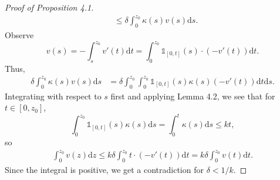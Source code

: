 \documentclass{article}
\begin{document}
\begin{proof}[Proof of Proposition 4.1]
\begin{align*}
        &\leq \delta\int_0^{z_0}\kappa(s)v(s)\mathrm{d}s.
    \end{align*}
    Observe
    \[v(s) = -\int_s^{z_0}v'(t)\mathrm{d}t  = \int_0^{z_0}\mathds 1_{[0,t]}(s)\cdot(-v'(t))\mathrm{d}t .\]
    Thus,
    \begin{align*}
        \delta\int_0^{z_0}\kappa(s)v(s)\mathrm{d}s &= \delta\int_0^{z_0}\int_0^{z_0}\mathds 1_{[0,t]}(s)\kappa(s)(-v'(t))\mathrm{d}t \mathrm{d}s.
    \end{align*}
    Integrating with respect to $s$ first and applying Lemma 4.2, we see that for $t\in[0,z_0]$,
    \[\int_0^{z_0}\mathds 1_{[0,t]}(s)\kappa(s)\mathrm{d}s =  \int_0^t \kappa(s)\mathrm{d}s \leq kt,\]
    so
    \begin{align*}
        \int_0^{z_0}v(z)\mathrm{d}z \leq k\delta \int_0^{z_0}t\cdot(-v'(t))\mathrm{d}t  = k\delta\int_0^{z_0}v(t)\mathrm{d}t .
    \end{align*}
    Since the integral is positive, we get a contradiction for $\delta < 1/k$.
\end{proof}
\end{document}
